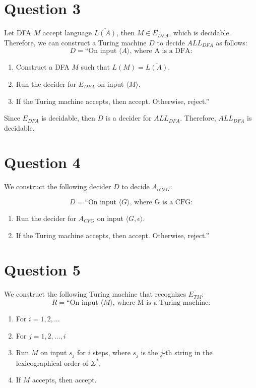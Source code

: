 \documentclass[a4paper, UTF-8]{article}
\theoremstyle{plain}
\begin{document}
\section{Question 3} 

Let DFA $M$ accept language $\overline{L(A)}$, then $M \in E_{DFA}$, which is decidable. Therefore, we can construct a Turing machine $D$ to decide $ALL_{DFA}$ as follows:
$$
D = \text{``On input } \langle A \rangle \text{, where A is a DFA:}
$$
\begin{enumerate} 
    \item Construct a DFA $M$ such that $L(M) = \overline{L(A)}$. 
    \item Run the decider for $E_{DFA}$ on input $\langle M \rangle$. 
    \item If the Turing machine accepts, then accept. Otherwise, reject.''
\end{enumerate}
Since $E_{DFA}$ is decidable, then $D$ is a decider for $ALL_{DFA}$. Therefore, $ALL_{DFA}$ is decidable.

\section{Question 4} 

We construct the following decider $D$ to decide $A_{\epsilon CFG}$: 

$$
D = \text{``On input } \langle G \rangle \text{, where G is a CFG:}
$$
\begin{enumerate}
    \item Run the decider for $A_{CFG}$ on input $\langle G, \epsilon \rangle$. 
    \item If the Turing machine accepts, then accept. Otherwise, reject.''
\end{enumerate}

\section{Question 5} 

We construct the following Turing machine that recognizes $\overline{E_{TM}}$: 
$$
R = \text{``On input } \langle M \rangle \text{, where M is a Turing machine:}
$$

\begin{enumerate}
    \item For $i = 1, 2, \ldots$ 
        \item For $j = 1, 2, \ldots, i$ 
            \item Run $M$ on input $s_j$ for $i$ steps, where $s_j$ is the $j$-th string in the lexicographical order of $\Sigma^*$.
            \item If $M$ accepts, then accept. 
\end{enumerate} 
\end{document}
